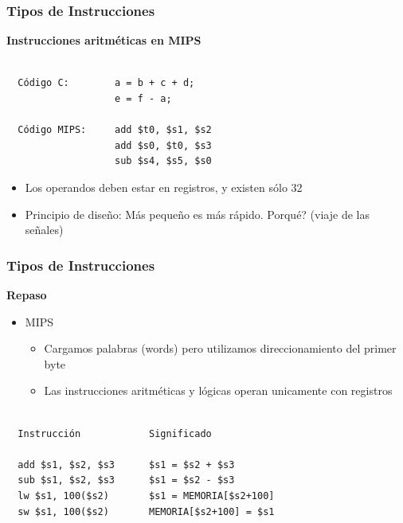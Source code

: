 \documentclass[aspectratio=169,compress]{beamer}
\begin{document}
\begin{footnotesize}
\begin{frame}[fragile]
\begin{verbatim}
\end{verbatim}

\end{frame}



\begin{frame}[fragile]
\frametitle{Tipos de Instrucciones}
\begin{center}\textbf{Instrucciones aritméticas en MIPS}\end{center}

\begin{verbatim}

  Código C:        a = b + c + d;
                   e = f - a;

  Código MIPS:     add $t0, $s1, $s2
                   add $s0, $t0, $s3
                   sub $s4, $s5, $s0
\end{verbatim}
\begin{itemize}
\item Los operandos deben estar en registros, y existen sólo 32
\item Principio de diseño: Más pequeño es más rápido. Porqué? (viaje de las señales)
\end{itemize}
\end{frame}



\begin{frame}[fragile]
\frametitle{Tipos de Instrucciones}
\begin{center}\textbf{Repaso}\end{center}

\begin{itemize}
\item MIPS
\begin{itemize}
\item Cargamos palabras (words) pero utilizamos direccionamiento del primer byte
\item Las instrucciones aritméticas y lógicas operan unicamente con registros
\end{itemize}
\end{itemize}
\begin{verbatim}

  Instrucción            Significado

  add $s1, $s2, $s3      $s1 = $s2 + $s3
  sub $s1, $s2, $s3      $s1 = $s2 - $s3
  lw $s1, 100($s2)       $s1 = MEMORIA[$s2+100]
  sw $s1, 100($s2)       MEMORIA[$s2+100] = $s1
\end{verbatim}
\end{frame}



























\end{footnotesize}
\end{document}
